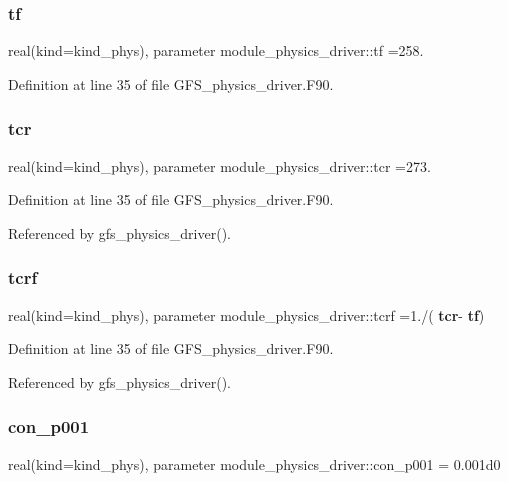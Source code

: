\subsubsection{tf}
{\footnotesize\ttfamily real(kind=kind\+\_\+phys), parameter module\+\_\+physics\+\_\+driver\+::tf =258.}



Definition at line 35 of file G\+F\+S\+\_\+physics\+\_\+driver.\+F90.

\mbox{\label{namespacemodule__physics__driver_a9853364a9d20460ff181d784f3d227b3}} 
\subsubsection{tcr}
{\footnotesize\ttfamily real(kind=kind\+\_\+phys), parameter module\+\_\+physics\+\_\+driver\+::tcr =273.}



Definition at line 35 of file G\+F\+S\+\_\+physics\+\_\+driver.\+F90.



Referenced by gfs\+\_\+physics\+\_\+driver().

\mbox{\label{namespacemodule__physics__driver_af89c09f19c7a6237e1c5264c925adbee}} 
\subsubsection{tcrf}
{\footnotesize\ttfamily real(kind=kind\+\_\+phys), parameter module\+\_\+physics\+\_\+driver\+::tcrf =1./(\textbf{ tcr}-\/\textbf{ tf})}



Definition at line 35 of file G\+F\+S\+\_\+physics\+\_\+driver.\+F90.



Referenced by gfs\+\_\+physics\+\_\+driver().

\mbox{\label{namespacemodule__physics__driver_abe208304c4aa5dca2f6468eff08c1017}} 
\subsubsection{con\+\_\+p001}
{\footnotesize\ttfamily real(kind=kind\+\_\+phys), parameter module\+\_\+physics\+\_\+driver\+::con\+\_\+p001 = 0.\+001d0}



